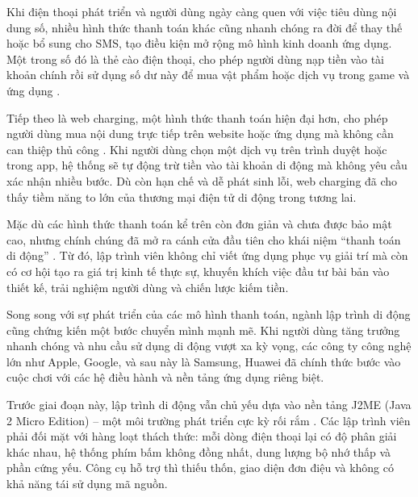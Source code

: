 \begin{flushleft}
\hspace*{0.8cm}Khi điện thoại phát triển và người dùng ngày càng quen với việc tiêu dùng nội dung số, nhiều hình thức thanh toán khác cũng nhanh chóng ra đời để thay thế hoặc bổ sung cho SMS, tạo điều kiện mở rộng mô hình kinh doanh ứng dụng. Một trong số đó là thẻ cào điện thoại, cho phép người dùng nạp tiền vào tài khoản chính rồi sử dụng số dư này để mua vật phẩm hoặc dịch vụ trong game và ứng dụng \cite{prepaid-topup}.
\end{flushleft}

\begin{flushleft}
\hspace*{0.8cm}Tiếp theo là web charging, một hình thức thanh toán hiện đại hơn, cho phép người dùng mua nội dung trực tiếp trên website hoặc ứng dụng mà không cần can thiệp thủ công \cite{web-charging}. Khi người dùng chọn một dịch vụ trên trình duyệt hoặc trong app, hệ thống sẽ tự động trừ tiền vào tài khoản di động mà không yêu cầu xác nhận nhiều bước. Dù còn hạn chế và dễ phát sinh lỗi, web charging đã cho thấy tiềm năng to lớn của thương mại điện tử di động trong tương lai.
\end{flushleft}

\begin{flushleft}
\hspace*{0.8cm}Mặc dù các hình thức thanh toán kể trên còn đơn giản và chưa được bảo mật cao, nhưng chính chúng đã mở ra cánh cửa đầu tiên cho khái niệm “thanh toán di động” \cite{mobile-payment-start}. Từ đó, lập trình viên không chỉ viết ứng dụng phục vụ giải trí mà còn có cơ hội tạo ra giá trị kinh tế thực sự, khuyến khích việc đầu tư bài bản vào thiết kế, trải nghiệm người dùng và chiến lược kiếm tiền.
\end{flushleft}

\begin{flushleft}
\hspace*{0.8cm}Song song với sự phát triển của các mô hình thanh toán, ngành lập trình di động cũng chứng kiến một bước chuyển mình mạnh mẽ. Khi người dùng tăng trưởng nhanh chóng và nhu cầu sử dụng di động vượt xa kỳ vọng, các công ty công nghệ lớn như Apple, Google, và sau này là Samsung, Huawei đã chính thức bước vào cuộc chơi với các hệ điều hành và nền tảng ứng dụng riêng biệt.
\end{flushleft}

\begin{flushleft}
\hspace*{0.8cm}Trước giai đoạn này, lập trình di động vẫn chủ yếu dựa vào nền tảng J2ME (Java 2 Micro Edition) – một môi trường phát triển cực kỳ rối rắm \cite{j2me-limitations}. Các lập trình viên phải đối mặt với hàng loạt thách thức: mỗi dòng điện thoại lại có độ phân giải khác nhau, hệ thống phím bấm không đồng nhất, dung lượng bộ nhớ thấp và phần cứng yếu. Công cụ hỗ trợ thì thiếu thốn, giao diện đơn điệu và không có khả năng tái sử dụng mã nguồn.
\end{flushleft}

